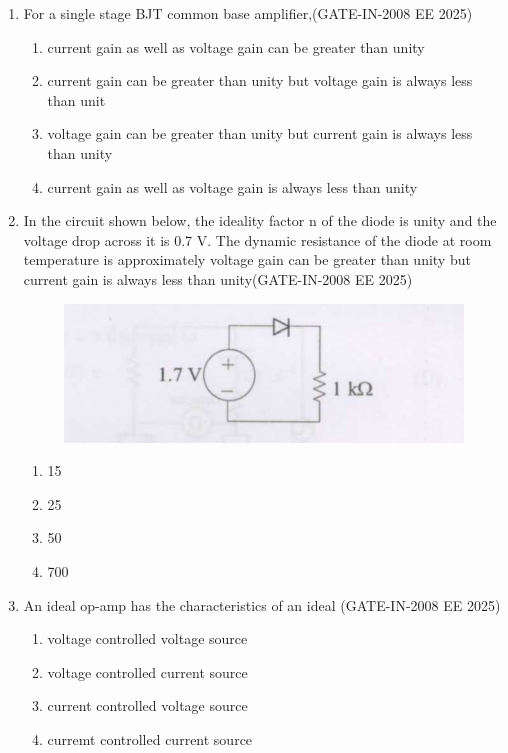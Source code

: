 \documentclass[journal,12pt,onecolumn]{IEEEtran}
\theoremstyle{remark}
\begin{document}
\begin{enumerate}[label=Q.\arabic*,start=1]
    \item For a single stage BJT common base amplifier,(GATE-IN-2008 EE 2025)
    \begin{enumerate} 
        \item current gain as well as voltage gain can be greater than unity
        \item current gain can be greater than unity but voltage gain is always less than unit 
        \item voltage gain can be greater than unity but current gain is always less than unity 
        \item current gain as well as voltage gain is always less than unity
    \end{enumerate}
    
    \item In the circuit shown below, the ideality factor n of the diode is unity and the voltage drop across it is 0.7 V. The dynamic resistance of the diode at room temperature is approximately  voltage gain can be greater than unity but current gain is always less than unity(GATE-IN-2008 EE 2025)

 \begin{figure}[H]
    \centering
    \includegraphics[width=0.5\linewidth]{figs/i3.jpg}
    \label{fig:q9_circuit}
\end{figure}
    \begin{enumerate} 
        \item 15 
        \item 25
        \item 50 
        \item 700
    \end{enumerate}
    
    \item An ideal op-amp has the characteristics of an ideal (GATE-IN-2008 EE 2025)
    \begin{enumerate} 
        \item voltage controlled voltage source
        \item voltage controlled current source 
        \item current controlled voltage source 
        \item curremt controlled current source
    \end{enumerate}
    

\end{enumerate}
\end{document}
